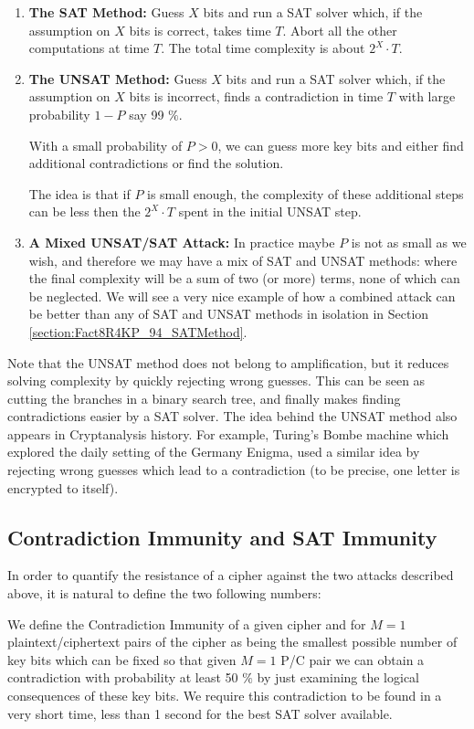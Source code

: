 \begin{enumerate}
	\item
	{\bf The SAT Method:}
	Guess $X$ bits and run a SAT solver which,
	if the assumption on $X$ bits is correct, takes time $T$.
	Abort all the other computations at time $T$.
	The total time complexity is about $2^{X}\cdot T$.
	\item
	{\bf The UNSAT Method:}
	Guess $X$ bits and run a SAT solver which,
	if the assumption on $X$ bits is incorrect,
	finds a contradiction in time $T$
	with large probability $1-P$ say 99 $\%$.
	
	With a small probability of $P>0$,
	we can guess more key bits
	and either find additional contradictions
	or find the solution.
	
	The idea is that if $P$ is small enough, the complexity of
	these additional steps can be less then the $2^{X}\cdot T$ spent
	in the initial UNSAT step.
	
	\item
	{\bf A Mixed UNSAT/SAT Attack:}
	In practice maybe $P$ is not as small as we wish, and therefore we may have
	a mix of SAT and UNSAT methods:
	where the final complexity will be a sum of two (or more) terms, none of which can be neglected.
	We will see a very nice example of
	how a combined attack can be better
	than any of SAT and UNSAT methods in isolation
	in Section \ref{section:Fact8R4KP_94_SATMethod}.
\end{enumerate}

Note that the UNSAT method does not belong to amplification, but it reduces solving complexity by quickly rejecting wrong guesses. This can be seen as cutting the branches in a binary search tree, and finally makes finding contradictions easier by a SAT solver. The idea behind the UNSAT method also appears in Cryptanalysis history. For example, Turing's Bombe machine which explored the daily setting of the Germany Enigma, used a similar idea by rejecting wrong guesses which lead to a contradiction (to be precise, one letter is encrypted to itself).

\subsection{Contradiction Immunity and SAT Immunity}
In order to quantify the resistance of a cipher against the two attacks described above,
it is natural to define the two following numbers:

\begin{mydef}
	We define the
	Contradiction Immunity of
	a given cipher
	and for $M=1$ plaintext/ciphertext pairs
	of the
	cipher as being
	the smallest possible
	number of key bits
	which can be fixed so that
	given $M=1$ P/C pair we
	can obtain a contradiction
	with probability at least
	50 $\%$ by just
	examining the logical consequences
	of these key bits.
	We require this contradiction
	to be found in a very short time,
	less than 1 second for
	the best SAT solver available.
\end{mydef}

